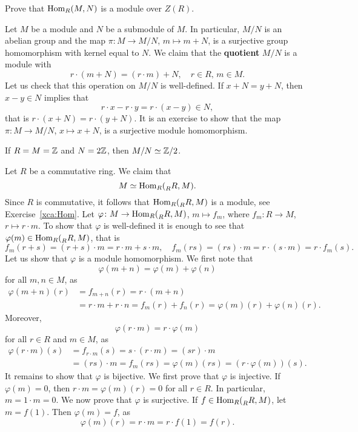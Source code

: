 \begin{exercise}
\label{xca:Hom}
Prove that $\operatorname{Hom}_R(M,N)$ is a module over $Z(R)$. 
\end{exercise}

Let $M$ be a module and $N$ be a submodule of $M$. In particular, $M/N$ is an abelian group
and the map $\pi\colon M\to M/N$, $m\mapsto m+N$, is a surjective group homomorphism with kernel equal to $N$. We claim
that the \textbf{quotient} $M/N$ is a module with  
\[
r\cdot (m+N)=(r\cdot m)+N,\quad
r\in R,\,m\in M. 
\]
Let us check that this operation on $M/N$ is well-defined. If $x+N=y+N$, then
$x-y\in N$ implies that  
\[
r\cdot x-r\cdot y=r\cdot (x-y)\in N,
\]
that is $r\cdot (x+N)=r\cdot (y+N)$. It is an exercise to show that
the map $\pi\colon M\to M/N$, $x\mapsto x+N$, is a 
surjective module homomorphism. 

\begin{example}
If $R=M=\mathbb{Z}$ and $N=2\mathbb{Z}$, then $M/N\simeq\mathbb{Z}/2$. 
\end{example}

\begin{example}
Let $R$ be a commutative ring. We claim that 
\[
M\simeq\operatorname{Hom}_R(\prescript{}{R}R,M).
\]
Since $R$ is commutative, it follows that $\operatorname{Hom}_R(\prescript{}{R}R,M)$ is a module, see Exercise~\ref{xca:Hom}.
Let $\varphi\colon M\to\operatorname{Hom}_R(\prescript{}{R}R,M)$, $m\mapsto f_m$, where $f_m\colon R\to M$, $r\mapsto r\cdot m$. 
To show that $\varphi$ is well-defined it is enough to see that $\varphi(m)\in\operatorname{Hom}_R(\prescript{}{R}R,M)$, that is 
\[
f_m(r+s)=(r+s)\cdot m=r\cdot m+s\cdot m,\quad
f_m(rs)=(rs)\cdot m=r\cdot (s\cdot m)=r\cdot f_m(s).
\]
Let us show that $\varphi$ is a module homomorphism. We first note that 
\[
\varphi(m+n)=\varphi(m)+\varphi(n)
\]
for all $m,n\in M$, as  
\begin{align*}
\varphi(m+n)(r)&=f_{m+n}(r)=r\cdot (m+n)\\
&=r\cdot m+r\cdot n=f_m(r)+f_n(r)=\varphi(m)(r)+\varphi(n)(r).
\end{align*}
Moreover, 
\[
\varphi(r\cdot m)=r\cdot\varphi(m)
\]
for all  
$r\in R$ and $m\in M$, as  
\begin{align*}
\varphi(r\cdot m)(s)&=f_{r\cdot m}(s)
=s\cdot (r\cdot m)
=(sr)\cdot m\\
&=(rs)\cdot m=f_m(rs)=\varphi(m)(rs)=(r\cdot\varphi(m))(s).
\end{align*}
It remains to show that $\varphi$ is bijective. We first prove that
$\varphi$ is injective. If $\varphi(m)=0$, then $r\cdot m=\varphi(m)(r)=0$ for all $r\in R$. In particular, 
$m=1\cdot m=0$. We now prove that $\varphi$ is surjective. If $f\in\operatorname{Hom}_R(\prescript{}{R}R,M)$, 
let $m=f(1)$. Then $\varphi(m)=f$, as
\[
\varphi(m)(r)=r\cdot m=r\cdot f(1)=f(r).
\]
\end{example}

